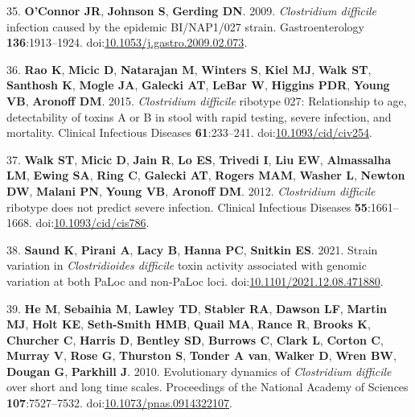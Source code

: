 \documentclass[
  12pt,
]{article}
\newenvironment{cslreferences}%
  {}%
  {\par}
\begin{document}
\begin{cslreferences}
\leavevmode\hypertarget{ref-OConnor2009}{}%
35. \textbf{O'Connor JR}, \textbf{Johnson S}, \textbf{Gerding DN}. 2009.
\emph{Clostridium difficile} infection caused by the epidemic
BI/NAP1/027 strain. Gastroenterology \textbf{136}:1913--1924.
doi:\href{https://doi.org/10.1053/j.gastro.2009.02.073}{10.1053/j.gastro.2009.02.073}.

\leavevmode\hypertarget{ref-Rao2015}{}%
36. \textbf{Rao K}, \textbf{Micic D}, \textbf{Natarajan M},
\textbf{Winters S}, \textbf{Kiel MJ}, \textbf{Walk ST}, \textbf{Santhosh
K}, \textbf{Mogle JA}, \textbf{Galecki AT}, \textbf{LeBar W},
\textbf{Higgins PDR}, \textbf{Young VB}, \textbf{Aronoff DM}. 2015.
\emph{Clostridium difficile} ribotype 027: Relationship to age,
detectability of toxins A or B in stool with rapid testing, severe
infection, and mortality. Clinical Infectious Diseases
\textbf{61}:233--241.
doi:\href{https://doi.org/10.1093/cid/civ254}{10.1093/cid/civ254}.

\leavevmode\hypertarget{ref-Walk2012}{}%
37. \textbf{Walk ST}, \textbf{Micic D}, \textbf{Jain R}, \textbf{Lo ES},
\textbf{Trivedi I}, \textbf{Liu EW}, \textbf{Almassalha LM},
\textbf{Ewing SA}, \textbf{Ring C}, \textbf{Galecki AT}, \textbf{Rogers
MAM}, \textbf{Washer L}, \textbf{Newton DW}, \textbf{Malani PN},
\textbf{Young VB}, \textbf{Aronoff DM}. 2012. \emph{Clostridium
difficile} ribotype does not predict severe infection. Clinical
Infectious Diseases \textbf{55}:1661--1668.
doi:\href{https://doi.org/10.1093/cid/cis786}{10.1093/cid/cis786}.

\leavevmode\hypertarget{ref-Saund2021}{}%
38. \textbf{Saund K}, \textbf{Pirani A}, \textbf{Lacy B}, \textbf{Hanna
PC}, \textbf{Snitkin ES}. 2021. Strain variation in \emph{Clostridioides
difficile} toxin activity associated with genomic variation at both
PaLoc and non-PaLoc loci.
doi:\href{https://doi.org/10.1101/2021.12.08.471880}{10.1101/2021.12.08.471880}.

\leavevmode\hypertarget{ref-He2010}{}%
39. \textbf{He M}, \textbf{Sebaihia M}, \textbf{Lawley TD},
\textbf{Stabler RA}, \textbf{Dawson LF}, \textbf{Martin MJ},
\textbf{Holt KE}, \textbf{Seth-Smith HMB}, \textbf{Quail MA},
\textbf{Rance R}, \textbf{Brooks K}, \textbf{Churcher C}, \textbf{Harris
D}, \textbf{Bentley SD}, \textbf{Burrows C}, \textbf{Clark L},
\textbf{Corton C}, \textbf{Murray V}, \textbf{Rose G}, \textbf{Thurston
S}, \textbf{Tonder A van}, \textbf{Walker D}, \textbf{Wren BW},
\textbf{Dougan G}, \textbf{Parkhill J}. 2010. Evolutionary dynamics of
\emph{Clostridium difficile} over short and long time scales.
Proceedings of the National Academy of Sciences \textbf{107}:7527--7532.
doi:\href{https://doi.org/10.1073/pnas.0914322107}{10.1073/pnas.0914322107}.


\end{cslreferences}
\end{document}
